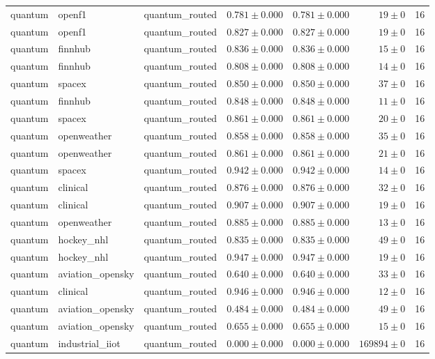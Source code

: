 \begin{table}[htbp]
\begin{tabular}{l l l r r r r}
quantum & openf1 & quantum\_routed & $0.781\pm0.000$ & $0.781\pm0.000$ & $19\pm0$ & 16 \\
quantum & openf1 & quantum\_routed & $0.827\pm0.000$ & $0.827\pm0.000$ & $19\pm0$ & 16 \\
quantum & finnhub & quantum\_routed & $0.836\pm0.000$ & $0.836\pm0.000$ & $15\pm0$ & 16 \\
quantum & finnhub & quantum\_routed & $0.808\pm0.000$ & $0.808\pm0.000$ & $14\pm0$ & 16 \\
quantum & spacex & quantum\_routed & $0.850\pm0.000$ & $0.850\pm0.000$ & $37\pm0$ & 16 \\
quantum & finnhub & quantum\_routed & $0.848\pm0.000$ & $0.848\pm0.000$ & $11\pm0$ & 16 \\
quantum & spacex & quantum\_routed & $0.861\pm0.000$ & $0.861\pm0.000$ & $20\pm0$ & 16 \\
quantum & openweather & quantum\_routed & $0.858\pm0.000$ & $0.858\pm0.000$ & $35\pm0$ & 16 \\
quantum & openweather & quantum\_routed & $0.861\pm0.000$ & $0.861\pm0.000$ & $21\pm0$ & 16 \\
quantum & spacex & quantum\_routed & $0.942\pm0.000$ & $0.942\pm0.000$ & $14\pm0$ & 16 \\
quantum & clinical & quantum\_routed & $0.876\pm0.000$ & $0.876\pm0.000$ & $32\pm0$ & 16 \\
quantum & clinical & quantum\_routed & $0.907\pm0.000$ & $0.907\pm0.000$ & $19\pm0$ & 16 \\
quantum & openweather & quantum\_routed & $0.885\pm0.000$ & $0.885\pm0.000$ & $13\pm0$ & 16 \\
quantum & hockey\_nhl & quantum\_routed & $0.835\pm0.000$ & $0.835\pm0.000$ & $49\pm0$ & 16 \\
quantum & hockey\_nhl & quantum\_routed & $0.947\pm0.000$ & $0.947\pm0.000$ & $19\pm0$ & 16 \\
quantum & aviation\_opensky & quantum\_routed & $0.640\pm0.000$ & $0.640\pm0.000$ & $33\pm0$ & 16 \\
quantum & clinical & quantum\_routed & $0.946\pm0.000$ & $0.946\pm0.000$ & $12\pm0$ & 16 \\
quantum & aviation\_opensky & quantum\_routed & $0.484\pm0.000$ & $0.484\pm0.000$ & $49\pm0$ & 16 \\
quantum & aviation\_opensky & quantum\_routed & $0.655\pm0.000$ & $0.655\pm0.000$ & $15\pm0$ & 16 \\
quantum & industrial\_iiot & quantum\_routed & $0.000\pm0.000$ & $0.000\pm0.000$ & $169894\pm0$ & 16 \\

\end{tabular}
\end{table}
